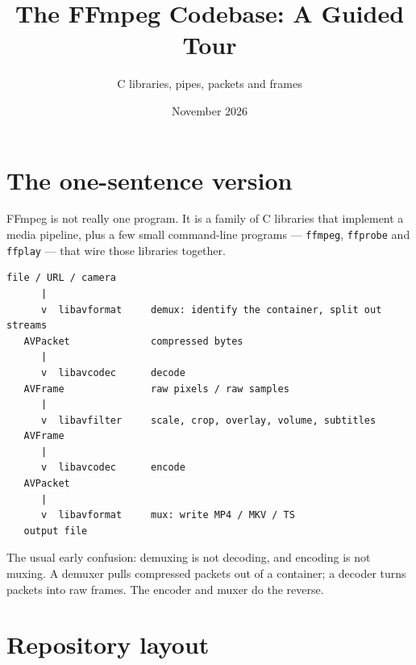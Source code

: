\documentclass[11pt]{article}
\begin{document}
\title{The FFmpeg Codebase: A Guided Tour}
\author{C libraries, pipes, packets and frames}
\date{November 2026}
\maketitle

\section{The one-sentence version}

FFmpeg is not really one program. It is a family of C libraries that implement
a media pipeline, plus a few small command-line programs --- \verb|ffmpeg|,
\verb|ffprobe| and \verb|ffplay| --- that wire those libraries together.

\begin{verbatim}
file / URL / camera
      |
      v  libavformat     demux: identify the container, split out streams
   AVPacket              compressed bytes
      |
      v  libavcodec      decode
   AVFrame               raw pixels / raw samples
      |
      v  libavfilter     scale, crop, overlay, volume, subtitles
   AVFrame
      |
      v  libavcodec      encode
   AVPacket
      |
      v  libavformat     mux: write MP4 / MKV / TS
   output file
\end{verbatim}

The usual early confusion: demuxing is not decoding, and encoding is not
muxing. A demuxer pulls compressed packets out of a container; a decoder turns
packets into raw frames. The encoder and muxer do the reverse.

\section{Repository layout}

\bigskip
\end{document}
